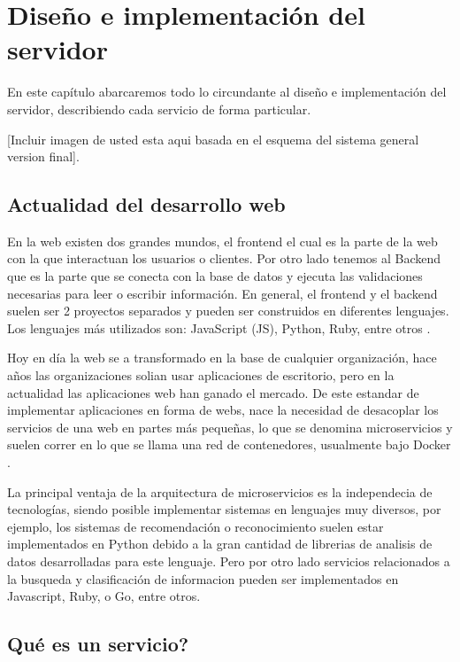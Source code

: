 \chapter{Diseño e implementación del servidor}

En este capítulo abarcaremos todo lo circundante al diseño e implementación del servidor, describiendo cada servicio de forma particular.

    [Incluir imagen de usted esta aqui basada en el esquema del sistema general version final].

\section{Actualidad del desarrollo web}

En la web existen dos grandes mundos, el frontend el cual es la parte de la web con la que interactuan los usuarios o clientes. Por otro lado tenemos al Backend que es la parte que se conecta con la base de datos y ejecuta las validaciones necesarias para leer o escribir información. En general, el frontend y el backend suelen ser 2 proyectos separados y pueden ser construidos en diferentes lenguajes. Los lenguajes más utilizados son: JavaScript (JS), Python, Ruby, entre otros \cite{noauthor_10_2021}.

Hoy en día la web se a transformado en la base de cualquier organización, hace años las organizaciones solian usar aplicaciones de escritorio, pero en la actualidad las aplicaciones web han ganado el mercado.
De este estandar de implementar aplicaciones en forma de webs, nace la necesidad de desacoplar los servicios de una web en partes más pequeñas, lo que se denomina microservicios y suelen correr en lo que se llama una red de contenedores, usualmente bajo Docker \cite{noauthor_documentacion_2023}.

La principal ventaja de la arquitectura de microservicios es la independecia de tecnologías, siendo posible implementar sistemas en lenguajes muy diversos, por ejemplo, los sistemas de recomendación o reconocimiento suelen estar implementados en Python debido a la gran cantidad de librerias de analisis de datos desarrolladas para este lenguaje. Pero por otro lado servicios relacionados a la busqueda y clasificación de informacion pueden ser implementados en Javascript, Ruby, o Go, entre otros.

\section{Qué es un servicio?}

